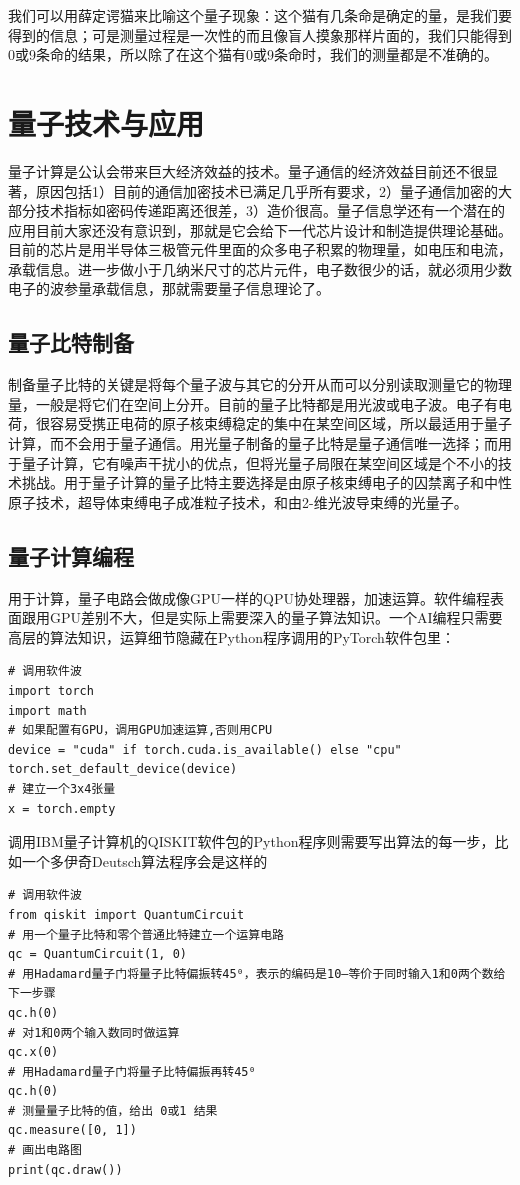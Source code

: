 \documentclass{ctexbook}
\begin{document}
我们可以用薛定谔猫来比喻这个量子现象：这个猫有几条命是确定的量，是我们要得到的信息；可是测量过程是一次性的而且像盲人摸象那样片面的，我们只能得到0或9条命的结果，所以除了在这个猫有0或9条命时，我们的测量都是不准确的。

\section{量子技术与应用}
量子计算是公认会带来巨大经济效益的技术。量子通信的经济效益目前还不很显著，原因包括1）目前的通信加密技术已满足几乎所有要求，2）量子通信加密的大部分技术指标如密码传递距离还很差，3）造价很高。量子信息学还有一个潜在的应用目前大家还没有意识到，那就是它会给下一代芯片设计和制造提供理论基础。目前的芯片是用半导体三极管元件里面的众多电子积累的物理量，如电压和电流，承载信息。进一步做小于几纳米尺寸的芯片元件，电子数很少的话，就必须用少数电子的波参量承载信息，那就需要量子信息理论了。

\subsection{量子比特制备}
制备量子比特的关键是将每个量子波与其它的分开从而可以分别读取测量它的物理量，一般是将它们在空间上分开。目前的量子比特都是用光波或电子波。电子有电荷，很容易受携正电荷的原子核束缚稳定的集中在某空间区域，所以最适用于量子计算，而不会用于量子通信。用光量子制备的量子比特是量子通信唯一选择；而用于量子计算，它有噪声干扰小的优点，但将光量子局限在某空间区域是个不小的技术挑战。用于量子计算的量子比特主要选择是由原子核束缚电子的囚禁离子和中性原子技术，超导体束缚电子成准粒子技术，和由2-维光波导束缚的光量子。

\subsection{量子计算编程}
用于计算，量子电路会做成像GPU一样的QPU协处理器，加速运算。软件编程表面跟用GPU差别不大，但是实际上需要深入的量子算法知识。一个AI编程只需要高层的算法知识，运算细节隐藏在Python程序调用的PyTorch软件包里：
\begin{lstlisting}
# 调用软件波
import torch
import math
# 如果配置有GPU，调用GPU加速运算,否则用CPU
device = "cuda" if torch.cuda.is_available() else "cpu"
torch.set_default_device(device)
# 建立一个3x4张量
x = torch.empty
\end{lstlisting}

调用IBM量子计算机的QISKIT软件包的Python程序则需要写出算法的每一步，比如一个多伊奇Deutsch算法程序会是这样的
\begin{lstlisting}
# 调用软件波
from qiskit import QuantumCircuit
# 用一个量子比特和零个普通比特建立一个运算电路
qc = QuantumCircuit(1, 0)
# 用Hadamard量子门将量子比特偏振转45⁰，表示的编码是10—等价于同时输入1和0两个数给下一步骤
qc.h(0)
# 对1和0两个输入数同时做运算
qc.x(0)
# 用Hadamard量子门将量子比特偏振再转45⁰
qc.h(0)
# 测量量子比特的值，给出 0或1 结果
qc.measure([0, 1])
# 画出电路图
print(qc.draw())
\end{lstlisting}
\end{document}
